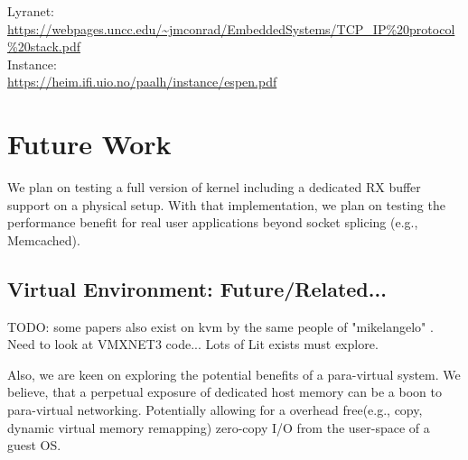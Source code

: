 Lyranet:\\
\url{https://webpages.uncc.edu/~jmconrad/EmbeddedSystems/TCP_IP\%20protocol\%20stack.pdf}\\
Instance:\\
\url{https://heim.ifi.uio.no/paalh/instance/espen.pdf}\\

\section{Future Work}
We plan on testing a full version of \oursys kernel including a dedicated RX buffer support on a physical setup. With that implementation, we plan on testing the performance benefit for real user applications beyond socket splicing (e.g., Memcached).

\subsection{Virtual Environment: Future/Related...}
TODO: some papers also exist on kvm by the same people of "mikelangelo" \cite{mikelangelo}. Need to look at VMXNET3 code... Lots of Lit exists must explore.

Also, we are keen on exploring the potential benefits of \oursys a para-virtual system. We believe, that a perpetual exposure of dedicated host memory can be a boon to para-virtual networking. Potentially allowing for a overhead free(e.g., copy, dynamic virtual memory remapping) zero-copy I/O from the user-space of a guest OS.


